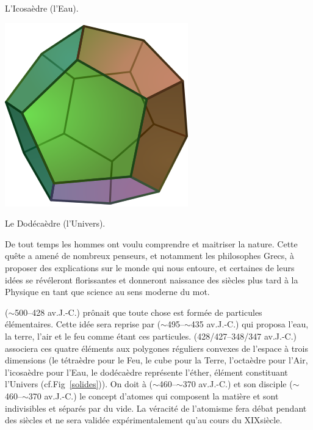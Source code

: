 {\vspace*{-0.25cm}
\begin{center}\normalfont\small {L'Icosaèdre (l'Eau).}\end{center}
\vspace*{-0.25cm}
\includegraphics[width=0.25\marginparwidth]{SM/Dodecahedron.png}
\vspace*{-0.25cm}
\begin{center}\normalfont\small {Le Dodécaèdre (l'Univers).}\end{center}
\vspace*{-0.25cm}
\label{solides}
}
De tout temps les hommes ont voulu comprendre et maitriser la nature. Cette quête a amené de nombreux penseurs, et notamment les philosophes Grecs, à proposer des explications sur le monde qui nous entoure, et certaines de leurs idées se révéleront florissantes et donneront naissance des siècles plus tard à la Physique en tant que science au sens moderne du mot. 

 ($\sim$\num{500}--\num{428} av.J.-C.) prônait que toute chose est formée de particules élémentaires. Cette idée sera reprise par  ($\sim$\num{495}--$\sim$\num{435} av.J.-C.) qui proposa l'eau, la terre, l'air et le feu comme étant ces particules.  (\num{428}/\num{427}--\num{348}/\num{347} av.J.-C.) associera ces quatre éléments aux polygones réguliers convexes de l'espace à trois dimensions (le tétraèdre pour le Feu, le cube pour la Terre, l'octaèdre pour l'Air, l'icosaèdre pour l'Eau, le dodécaèdre représente l'éther, élément constituant l'Univers (cf.Fig~\ref{solides})). On doit à  ($\sim$\num{460}--$\sim$\num{370} av.J.-C.) et son disciple  ($\sim$\num{460}--$\sim$\num{370} av.J.-C.) le concept d'atomes qui composent la matière et sont indivisibles et séparés par du vide. La véracité de l'atomisme fera débat pendant des siècles et ne sera validée expérimentalement qu'au cours du XIX\ieme siècle.


